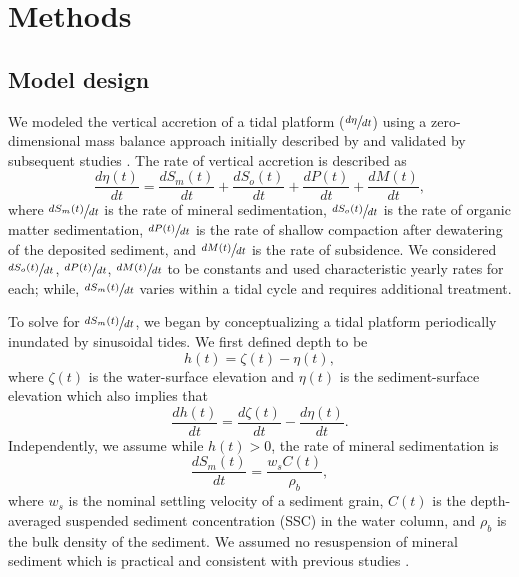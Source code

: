 \section{Methods}

\subsection{Model design}

We modeled the vertical accretion of a tidal platform ($\sfrac{d\eta}{dt}$) using a zero-dimensional mass balance approach initially described by \citet{kroneMethodSimulatingMarsh1987} and validated by subsequent studies \citep{allenSaltmarshGrowthStratification1990,frenchNumericalSimulationVertical1993,temmermanModellingLongtermTidal2003,temmermanModellingEstuarineVariations2004}. The rate of vertical accretion is described as
\begin{equation}\label{eq:mass_bal}
	\frac{d\eta(t)}{dt} = \frac{dS_m(t)}{dt} + \frac{dS_o(t)}{dt} + \frac{dP(t)}{dt} + \frac{dM(t)}{dt},
\end{equation}
where $\sfrac{dS_m(t)}{dt}$ is the rate of mineral sedimentation, $\sfrac{dS_o(t)}{dt}$ is the rate of organic matter sedimentation, $\sfrac{dP(t)}{dt}$ is the rate of shallow compaction after dewatering of the deposited sediment, and $\sfrac{dM(t)}{dt}$ is the rate of subsidence. We considered $\sfrac{dS_o(t)}{dt}$, $\sfrac{dP(t)}{dt}$, $\sfrac{dM(t)}{dt}$ to be constants and used characteristic yearly rates for each; while, $\sfrac{dS_m(t)}{dt}$ varies within a tidal cycle \citep{haleSeasonalVariabilityForces2019} and requires additional treatment.

To solve for $\sfrac{dS_m(t)}{dt}$, we began by conceptualizing a tidal platform periodically inundated by sinusoidal tides. We first defined depth to be
\begin{equation}\label{eq:depth}
	h(t) = \zeta(t) - \eta(t),
\end{equation}
where $\zeta(t)$ is the water-surface elevation and $\eta(t)$ is the sediment-surface elevation which also implies that
\begin{equation}\label{eq:depth_dt}
	\frac{dh(t)}{dt} = \frac{d\zeta(t)}{dt} - \frac{d\eta(t)}{dt}.
\end{equation}
Independently, we assume while $h(t) > 0$, the rate of mineral sedimentation is
\begin{equation}\label{eq:sed_flux}
	\frac{dS_m(t)}{dt} = \frac{w_sC(t)}{\rho_b},
\end{equation}
where $w_s$ is the nominal settling velocity of a sediment grain, $C(t)$ is the depth-averaged suspended sediment concentration (SSC) in the water column, and $\rho_b$ is the bulk density of the sediment. We assumed no resuspension of mineral sediment which is practical and consistent with previous studies \citep{kroneMethodSimulatingMarsh1987, allenSaltmarshGrowthStratification1990, frenchNumericalSimulationVertical1993, temmermanModellingLongtermTidal2003, temmermanModellingEstuarineVariations2004}.

